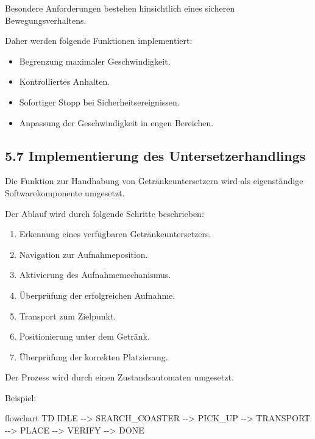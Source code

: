 \documentclass[
]{article}
\newenvironment{Shaded}{}{}
\newcommand{\NormalTok}[1]{#1}
\providecommand{\tightlist}{%
  \setlength{\itemsep}{0pt}\setlength{\parskip}{0pt}}
\begin{document}
Besondere Anforderungen bestehen hinsichtlich eines sicheren
Bewegungsverhaltens.

Daher werden folgende Funktionen implementiert:

\begin{itemize}
\tightlist
\item
  Begrenzung maximaler Geschwindigkeit.
\item
  Kontrolliertes Anhalten.
\item
  Sofortiger Stopp bei Sicherheitsereignissen.
\item
  Anpassung der Geschwindigkeit in engen Bereichen.
\end{itemize}

\subsection{5.7 Implementierung des
Untersetzerhandlings}\label{implementierung-des-untersetzerhandlings}

Die Funktion zur Handhabung von Getränkeuntersetzern wird als
eigenständige Softwarekomponente umgesetzt.

Der Ablauf wird durch folgende Schritte beschrieben:

\begin{enumerate}
\def\labelenumi{\arabic{enumi}.}
\tightlist
\item
  Erkennung eines verfügbaren Getränkeuntersetzers.
\item
  Navigation zur Aufnahmeposition.
\item
  Aktivierung des Aufnahmemechanismus.
\item
  Überprüfung der erfolgreichen Aufnahme.
\item
  Transport zum Zielpunkt.
\item
  Positionierung unter dem Getränk.
\item
  Überprüfung der korrekten Platzierung.
\end{enumerate}

Der Prozess wird durch einen Zustandsautomaten umgesetzt.

Beispiel:

\begin{Shaded}
\begin{Highlighting}[]
\NormalTok{flowchart TD}
\NormalTok{IDLE {-}{-}\textgreater{} SEARCH\_COASTER {-}{-}\textgreater{} PICK\_UP {-}{-}\textgreater{} TRANSPORT {-}{-}\textgreater{} PLACE {-}{-}\textgreater{} VERIFY {-}{-}\textgreater{} DONE}
\end{Highlighting}
\end{Shaded}
\end{document}
